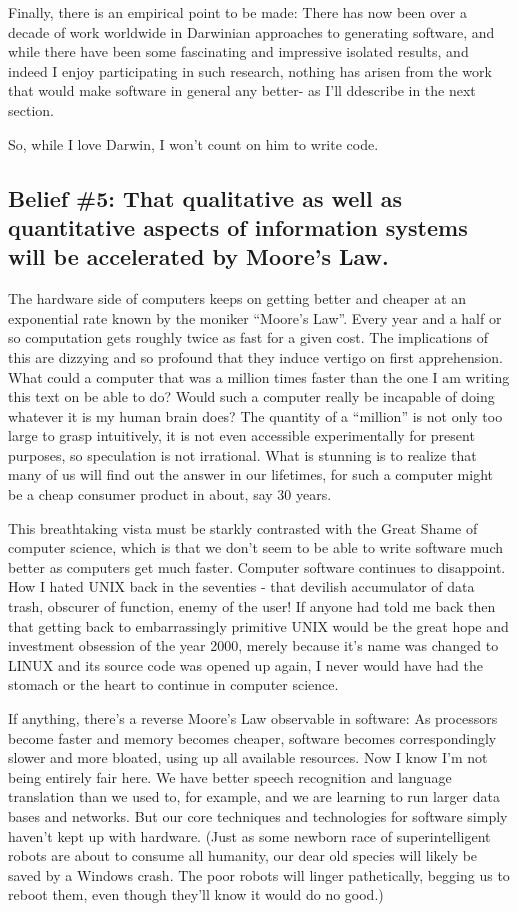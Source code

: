 \documentclass[letterpaper,12pt,english]{sphinxmanual}
\begin{document}
Finally, there is an empirical point to be made: There has now been over a decade of work worldwide in Darwinian approaches to generating software, and while there have been some fascinating and impressive isolated results, and indeed I enjoy participating in such research, nothing has arisen from the work that would make software in general any better- as I'll ddescribe in the next section.

So, while I love Darwin, I won't count on him to write code.


\subsection{Belief \#5: \textbf{That qualitative as well as quantitative aspects of information systems will be accelerated by Moore's Law}.}
\label{lanier:belief-5-that-qualitative-as-well-as-quantitative-aspects-of-information-systems-will-be-accelerated-by-moore-s-law}
The hardware side of computers keeps on getting better and cheaper at an exponential rate known by the moniker ``Moore's Law''. Every year and a half or so computation gets roughly twice as fast for a given cost. The implications of this are dizzying and so profound that they induce vertigo on first apprehension. What could a computer that was a million times faster than the one I am writing this text on be able to do? Would such a computer really be incapable of doing whatever it is my human brain does? The quantity of a ``million'' is not only too large to grasp intuitively, it is not even accessible experimentally for present purposes, so speculation is not irrational. What is stunning is to realize that many of us will find out the answer in our lifetimes, for such a computer might be a cheap consumer product in about, say 30 years.

This breathtaking vista must be starkly contrasted with the Great Shame of computer science, which is that we don't seem to be able to write software much better as computers get much faster. Computer software continues to disappoint. How I hated UNIX back in the seventies - that devilish accumulator of data trash, obscurer of function, enemy of the user! If anyone had told me back then that getting back to embarrassingly primitive UNIX would be the great hope and investment obsession of the year 2000, merely because it's name was changed to LINUX and its source code was opened up again, I never would have had the stomach or the heart to continue in computer science.

If anything, there's a reverse Moore's Law observable in software: As processors become faster and memory becomes cheaper, software becomes correspondingly slower and more bloated, using up all available resources. Now I know I'm not being entirely fair here. We have better speech recognition and language translation than we used to, for example, and we are learning to run larger data bases and networks. But our core techniques and technologies for software simply haven't kept up with hardware. (Just as some newborn race of superintelligent robots are about to consume all humanity, our dear old species will likely be saved by a Windows crash. The poor robots will linger pathetically, begging us to reboot them, even though they'll know it would do no good.)
\end{document}
